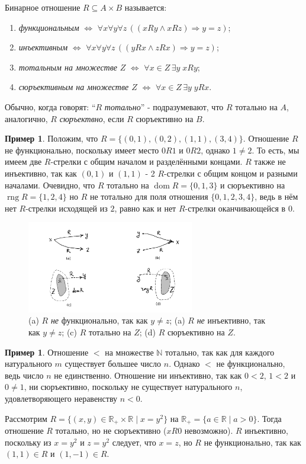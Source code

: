 \documentclass[12pt,notitlepage]{article}
\theoremstyle{plain}
\theoremstyle{definition}
\newtheorem{exm}[thm]{Пример}
\theoremstyle{plain}
\newcommand{\N}{\mathbb{N}}
\newcommand{\R}{\mathbb{R}}
\newcommand{\sbs}{\subseteq}
\newcommand{\dom}{\mathop{\mathrm{dom}}}
\newcommand{\rng}{\mathop{\mathrm{rng}}}
\newcommand{\1}{\mathbf{1}}
\newcommand{\0}{\mathbf{0}}
\newcommand{\ply}{\Longrightarrow}
\begin{document}
Бинарное отношение $R \sbs A \times B$ называется:
\begin{enumerate}
	\item \emph{функциональным} $\iff$ $\forall x \forall y \forall z\, ( (x R y \wedge x R z) \ply y = z )$;
	\item \emph{инъективным} $\iff$ $\forall x \forall y \forall z\, ( (y R x \wedge z R x) \ply y = z )$;
	\item \emph{тотальным на множестве} $Z$ $\iff$ $\forall x \in Z\, \exists y\; x R y$;
	\item \emph{сюръективным на множестве $Z$} $\iff$ $\forall x \in Z\, \exists y\; y R x$.
\end{enumerate}
Обычно, когда говорят: ``$R$ \emph{тотально}'' - подразумевают, что $R$ тотально на $A$, аналогично, $R$ \emph{сюръектвно}, если $R$ сюръективно на $B$.

\begin{exm}
	Положим, что $R = \{(0,1), (0,2), (1,1), (3,4)\}$. Отношение $R$ не функционально, поскольку имеет место $0 R 1$ и $0 R 2$, однако $1 \neq 2$. То есть, мы имеем две $R$-стрелки с общим началом и разделёнными концами. $R$ также не инъективно, так как $(0, 1)$ и $(1, 1)$ - 2 $R$-стрелки с общим концом и разными началами. Очевидно, что $R$ тотально на $\dom R = \{0,1,3\}$ и сюръективно на $\rng R = \{1,2,4\}$ но $R$ не тотально для поля отношения $\{0,1,2,3,4\}$, ведь в нём нет $R$-стрелки исходящей из $2$, равно как и нет $R$-стрелки оканчивающейся в $0$.
\end{exm}

\begin{figure}[h]
	\centering
	\includegraphics*[width=0.65\textwidth]{func_etc.pdf}
	\caption{(a) $R$ \emph{не} функционально, так как $y \neq z$; (a) $R$ \emph{не} инъективно, так как $y \neq z$; (c) $R$ тотально на $Z$; (d) $R$ сюръективно на $Z$.}
\end{figure}


\begin{exm}
	Отношение ${<}$ на множестве $\N$ тотально, так как для каждого натурального $m$ существует большее число $n$. Однако ${<}$ не функционально, ведь число $n$ не единственно. Отношение ни инъективно, так как $0 < 2$, $1 < 2$ и $0 \neq 1$, ни сюръективно, поскольку не существует натурального $n$, удовлетворяющего неравенству $n < 0$. 
	
	Рассмотрим $R = \{(x,y) \in \R_{+} \times \R \mid x = y^2 \}$ на $\R_+ = \{a \in \R  \mid a > 0\}$. Тогда отношение $R$ тотально, но не сюръективно ($xR0$ невозможно). $R$ инъективно, поскольку из $x = y^2$ и $z = y^2$ следует, что $x = z$, но $R$ не функционально, так как $(1, 1) \in R$ и $(1, -1) \in R$.
\end{exm}
\end{document}
